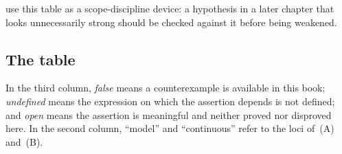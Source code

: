  use this table as a scope-discipline
device: a hypothesis in a later chapter that looks unnecessarily strong
should be checked against it before being weakened.

\subsection{The table}
\label{sec:ch19-limitations-table}

In the third column, \emph{false} means a counterexample is available in
this book; \emph{undefined} means the expression on which the assertion
depends is not defined; and \emph{open} means the assertion is meaningful
and neither proved nor disproved here.  In the second column, ``model'' and
``continuous'' refer to the loci of
\,(A) and~(B).

